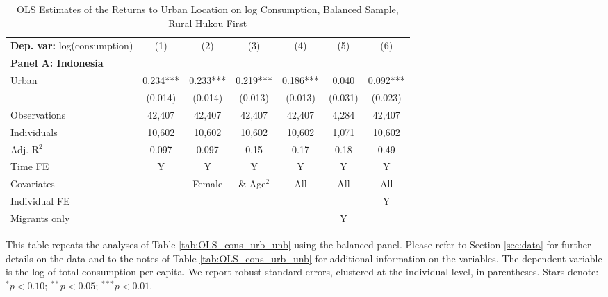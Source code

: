 \begin{table}[htbp] \centering \begin{threeparttable}
 \caption{OLS Estimates of the Returns to Urban Location on log Consumption, Balanced Sample, Rural Hukou First} 
 \label{tab:OLS_CHN_hukou_rural_first_consumption_urban_bal} 
\begin{tabular}{l cccccc} \toprule  \textbf{Dep. var:}  log(consumption) 
                    &\multicolumn{1}{c}{(1)}   &\multicolumn{1}{c}{(2)}   &\multicolumn{1}{c}{(3)}   &\multicolumn{1}{c}{(4)}   &\multicolumn{1}{c}{(5)}   &\multicolumn{1}{c}{(6)}   \\
\textbf{Panel A: Indonesia} \\
Urban               &       0.234***&       0.233***&       0.219***&       0.186***&       0.040   &       0.092***\\
                    &     (0.014)   &     (0.014)   &     (0.013)   &     (0.013)   &     (0.031)   &     (0.023)   \\
\addlinespace
Observations        &      42,407   &      42,407   &      42,407   &      42,407   &       4,284   &      42,407   \\
Individuals         &      10,602   &      10,602   &      10,602   &      10,602   &       1,071   &      10,602   \\
Adj. R$^{2}$        &       0.097   &       0.097   &        0.15   &        0.17   &        0.18   &        0.49   \\
\cmidrule{2 -7} Time FE & Y & Y & Y & Y & Y & Y \\ Covariates & & Female & \& Age$^2$ & All & All & All \\ Individual FE & & & & & & Y \\ Migrants only & & & & & Y & \\ \bottomrule \end{tabular} \begin{tablenotes}[flushleft] \footnotesize \item{This table repeats the analyses of Table \ref{tab:OLS_cons_urb_unb}  using the balanced panel. Please refer to Section \ref{sec:data} for further details on the data and to the notes of Table \ref{tab:OLS_cons_urb_unb} for additional information on the variables. The dependent variable is the log of total consumption per capita. We report robust standard errors, clustered at the individual level, in parentheses. Stars denote: $^{*} p<0.10$; $^{**} p<0.05$; $^{***} p<0.01$.} \end{tablenotes} \end{threeparttable} \end{table}
